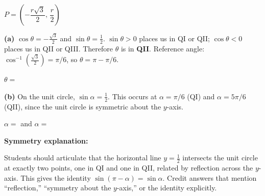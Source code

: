 \documentclass[10pt]{article}
\begin{document}
\begin{tcolorbox}[colback=white, colframe=black!40,
    title=\textbf{Tier E --- Symmetry and Inverse Reasoning},
    fonttitle=\bfseries, arc=2mm, left=3mm, right=3mm, top=2mm, bottom=2mm]
\small
$P = \left(-\dfrac{r\sqrt{3}}{2},\, \dfrac{r}{2}\right)$

\textbf{(a)} $\cos\theta = -\tfrac{\sqrt{3}}{2}$ and $\sin\theta = \tfrac{1}{2}$.
$\sin\theta > 0$ places us in QI or QII; $\cos\theta < 0$ places us in QII or QIII. Therefore $\theta$ is in \textbf{QII}.
Reference angle: $\cos^{-1}\!\left(\tfrac{\sqrt{3}}{2}\right) = \pi/6$, so $\theta = \pi - \pi/6$.

$\theta = $ 

\vspace{0.08in}
\textbf{(b)} On the unit circle, $\sin\alpha = \tfrac{1}{2}$. This occurs at $\alpha = \pi/6$ (QI) and $\alpha = 5\pi/6$ (QII), since the unit circle is symmetric about the $y$-axis.

$\alpha = $  and $\alpha = $ 

\vspace{0.06in}
\textbf{Symmetry explanation:}

\begin{teachernote}
Students should articulate that the horizontal line $y = \tfrac{1}{2}$ intersects the unit circle at exactly two points, one in QI and one in QII, related by reflection across the $y$-axis. This gives the identity $\sin(\pi - \alpha) = \sin\alpha$. Credit answers that mention ``reflection,'' ``symmetry about the $y$-axis,'' or the identity explicitly.
\end{teachernote}

\end{tcolorbox}
\end{document}
